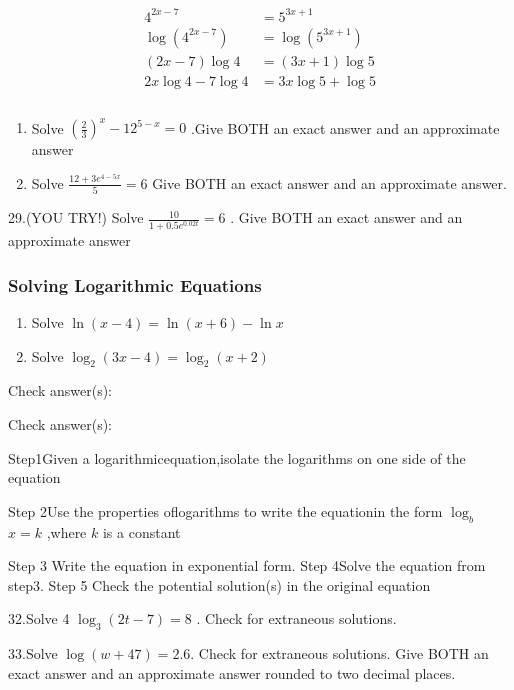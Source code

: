 \documentclass{book}
\begin{document}
	\begin{align}
		4^{2x-7} & =5^{3x+1} \\ \log (4^{2x-7})&=\log (5^{3x+1}) \\ (2x-7) \log 4 &= (3x+1) \log 5 \\ 2x \log 4 - 7 \log 4 &= 3x\log 5 + \log 5 \\  \\
	\end{align}


\begin{enumerate}
	\def\labelenumi{\arabic{enumi}.}
	\setcounter{enumi}{26}
	\item
	      Solve \(\left(\frac{2}{3}\right)^{x}-12^{5-x}=0\) .Give BOTH an exact
	      answer and an approximate answer
	\item
	      Solve \(\frac{12+3e^{4-5x}}{5}=6\) Give BOTH an exact answer and an
	      approximate answer.
\end{enumerate}

29.(YOU TRY!) Solve \(\frac{10}{1+0.5e^{0.02t}}=6\) . Give BOTH an exact
answer and an approximate answer

\subsubsection{Solving Logarithmic
	Equations}\label{solving-logarithmic-equations}

\begin{enumerate}
	\def\labelenumi{\arabic{enumi}.}
	\setcounter{enumi}{30}
	\item
	      Solve \(\ln(x-4)=\ln(x+6)-\ln x\)
	\item
	      Solve \(\log_{2}(3x-4)=\log_{2}(x+2)\)
\end{enumerate}

Check answer(s):

Check answer(s):

Step1Given a logarithmicequation,isolate the logarithms on one side of
the equation

Step 2Use the properties oflogarithms to write the equationin the form
\(\log_b\) \(x=k\) ,where \(k\) is a constant

Step 3 Write the equation in exponential form. Step 4Solve the equation
from step3. Step 5 Check the potential solution(s) in the original
equation

32.Solve 4 \(\log_{3}(2t-7)=8\) . Check for extraneous solutions.

33.Solve \(\log(w+47)=2.6.\) Check for extraneous solutions. Give BOTH
an exact answer and an approximate answer rounded to two decimal places.
\end{document}
